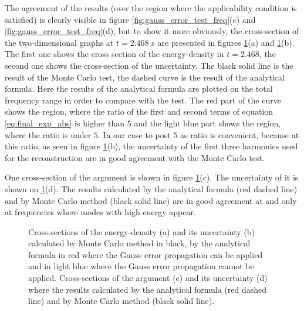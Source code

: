 \documentclass[a4paper,12pt,oneside]{article}
\begin{document}
The agreement of the results (over the region where the applicability condition is satisfied) is clearly visible in figure \ref{fig:gauss_error_test_freq}(c) and \ref{fig:gauss_error_test_freq}(d), but to show it more obviously, the cross-section of the two-dimensional graphs at $t = 2.468$ s are presented in figures \ref{fig:gauss_error_test_tim}(a) and \ref{fig:gauss_error_test_tim}(b). The first one shows the cross section of the energy-density in $t = 2.468$, the second one shows the cross-section of the uncertainty. The black solid line is the result of the Monte Carlo test, the dashed curve is the result of the analytical formula. Here the results of the analytical formula are plotted on the total frequency range in order to compare with the test. The red part of the curve shows the region, where the ratio of the first and second terms of equation \eqref{eq:final_exp_abs} is higher than $5$ and the light blue part shows the region, where the ratio is under $5$. In our case to post $5$ as ratio is convenient, because at this ratio, as seen in figure \ref{fig:gauss_error_test_tim}(b), the uncertainty of the first three harmonics used for the reconstruction are in good agreement with the Monte Carlo test.

One cross-section of the argument is shown in figure \ref{fig:gauss_error_test_tim}(c). The uncertainty of it is shown on \ref{fig:gauss_error_test_tim}(d). The results calculated by the analytical formula (red dashed line) and by Monte Carlo method (black solid line) are in good agreement at and only at frequencies where modes with high energy appear.

\begin{figure}[htb!]
  \centerline{}
  \caption{\label{fig:gauss_error_test_tim} Cross-sections of the energy-density (a) and its uncertainty (b) calculated by Monte Carlo method in black, by the analytical formula in red where the Gauss error propagation can be applied and in light blue where the Gauss error propagation cannot be applied. Cross-sections of the argument (c) and its uncertainty (d) where the results calculated by the analytical formula (red dashed line) and by Monte Carlo method (black solid line).}
\end{figure}
\end{document}
